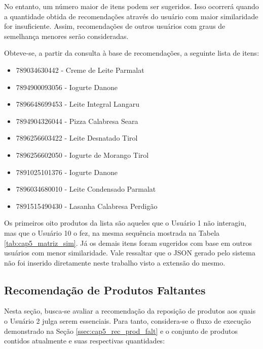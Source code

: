No entanto, um número maior de itens podem ser sugeridos. Isso ocorrerá quando a quantidade obtida de recomendações através do usuário com maior similaridade for insuficiente. Assim, recomendações de outros usuários com graus de semelhança menores serão consideradas.

Obteve-se, a partir da consulta à base de recomendações, a seguinte lista de itens:

\begin{itemize}[noitemsep,topsep=5pt]
    \item 789034630442 - Creme de Leite Parmalat
    \item 7894900093056 - Iogurte Danone
    \item 7896648699453 - Leite Integral Langaru
    \item 7894904326044 - Pizza Calabresa Seara
    \item 7896256603422 - Leite Desnatado Tirol
    \item 7896256602050 - Iogurte de Morango Tirol
    \item 7891025101376 - Iogurte Danone
    \item 7896034680010 - Leite Condensado Parmalat
    \item 7891515490430 - Lasanha Calabresa Perdigão
\end{itemize}


Os primeiros oito produtos da lista são aqueles que o Usuário 1 não interagiu, mas que o Usuário 10 o fez, na mesma sequência mostrada na Tabela \ref{tab:cap5_matriz_sim}. Já os demais itens foram sugeridos com base em outros usuários com menor similaridade. Vale ressaltar que o JSON gerado pelo sistema não foi inserido diretamente neste trabalho visto a extensão do mesmo.

\subsection{Recomendação de Produtos Faltantes}

Nesta seção, busca-se avaliar a recomendação da reposição de produtos aos quais o Usuário 2 julga serem essenciais. Para tanto, considera-se o fluxo de execução demonstrado na Seção \ref{ssec:cap5_rec_prod_falt} e o conjunto de produtos contidos atualmente e suas respectivas quantidades:


